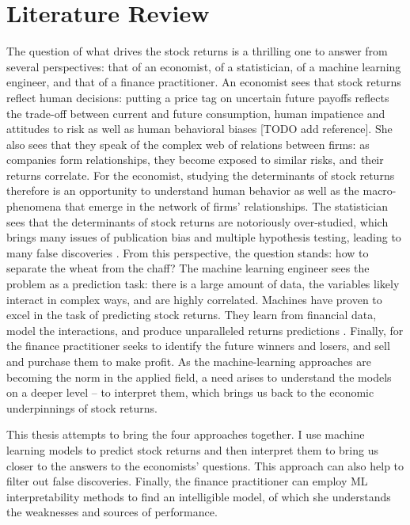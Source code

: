 \chapter{Literature Review}
\label{chap:lit} 
		
 	The question of what drives the stock returns is a thrilling one to answer from several perspectives: that of an economist, of a statistician, of a machine learning engineer, and that of a finance practitioner.
 	An economist sees that stock returns reflect human decisions: putting a price tag on uncertain future payoffs reflects the trade-off between current and future consumption, human impatience and attitudes to risk \citep{cochrane2009asset} as well as human behavioral biases [TODO add reference]. She also sees that they speak of the complex web of relations between firms: as companies form relationships, they become exposed to similar risks, and their returns correlate. For the economist, studying the determinants of stock returns therefore is an opportunity to understand human behavior as well as the macro-phenomena that emerge in the network of firms' relationships. 
 	The statistician sees that the determinants of stock returns are notoriously over-studied, which brings many issues of publication bias and multiple hypothesis testing, leading to many false discoveries \citep{harvey2016and}. From this perspective, the question stands: how to separate the wheat from the chaff? 
 	The machine learning engineer sees the problem as a prediction task: there is a large amount of data, the variables likely interact in complex ways, and are highly correlated. Machines have proven to excel in the task of predicting stock returns. They learn from financial data, model the interactions, and produce unparalleled returns predictions \citep{gu2020empirical}.
 	Finally, for the finance practitioner seeks to identify the future winners and losers, and sell and purchase them to make profit. As the machine-learning approaches are becoming the norm in the applied field, a need arises to understand the models on a deeper level – to interpret them, which brings us back to the economic underpinnings of stock returns.
 	
 	This thesis attempts to bring the four approaches together. I use machine learning models to predict stock returns and then interpret them to bring us closer to the answers to the economists' questions. This approach can also help to filter out false discoveries. Finally, the finance practitioner can employ ML interpretability methods to find an intelligible model, of which she understands the weaknesses and sources of performance. 
 	
